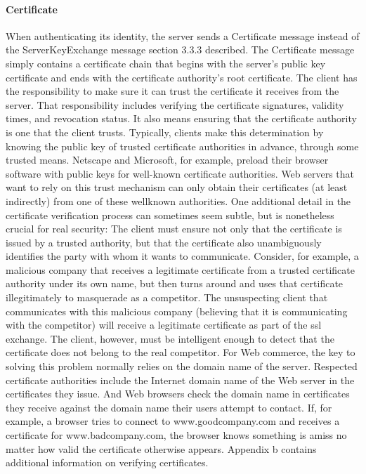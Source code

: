 \paragraph{Certificate}
When authenticating its identity, the server sends a Certificate message instead of the ServerKeyExchange message section 3.3.3 described. The Certificate message simply contains a certificate chain
that begins with the server’s public key certificate and ends with the
certificate authority’s root certificate.
The client has the responsibility to make sure it can trust the certificate it receives from the server. That responsibility includes verifying
the certificate signatures, validity times, and revocation status. It also
means ensuring that the certificate authority is one that the client
trusts. Typically, clients make this determination by knowing the
public key of trusted certificate authorities in advance, through some
trusted means. Netscape and Microsoft, for example, preload their
browser software with public keys for well-known certificate authorities. Web servers that want to rely on this trust mechanism can only
obtain their certificates (at least indirectly) from one of these wellknown authorities.
One additional detail in the certificate verification process can sometimes seem subtle, but is nonetheless crucial for real security: The client must ensure not only that the certificate is issued by a trusted
authority, but that the certificate also unambiguously identifies the
party with whom it wants to communicate. Consider, for example, a
malicious company that receives a legitimate certificate from a
trusted certificate authority under its own name, but then turns
around and uses that certificate illegitimately to masquerade as a
competitor. The unsuspecting client that communicates with this
malicious company (believing that it is communicating with the
competitor) will receive a legitimate certificate as part of the ssl exchange. The client, however, must be intelligent enough to detect
that the certificate does not belong to the real competitor. For Web
commerce, the key to solving this problem normally relies on the
domain name of the server. Respected certificate authorities include
the Internet domain name of the Web server in the certificates they
issue. And Web browsers check the domain name in certificates they
receive against the domain name their users attempt to contact. If,
for example, a browser tries to connect to www.goodcompany.com
and receives a certificate for www.badcompany.com, the browser
knows something is amiss no matter how valid the certificate otherwise appears. Appendix b contains additional information on verifying certificates.
